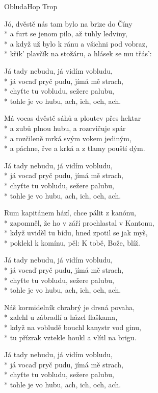 \documentclass[10.5pt]{book}
\begin{document}
\fi
\begin{poem}{Obluda}{Hop Trop}

\settowidth{\versewidth}{křik' plavčík na stožáru, a hlásek se mu třás'}

Jó, dvěstě nás tam bylo na brize do Číny\\*
a furt se jenom pilo, až tuhly ledviny,\\*
a když už bylo k ránu a všichni pod vobraz,\\*
křik' plavčík na stožáru, a hlásek se mu třás':

Já tady nebudu, já vidím vobludu,\\*
já vocaď pryč pudu, jímá mě strach,\\*
chyťte tu vobludu, sežere palubu,\\*
tohle je vo hubu, ach, ich, och, ach.

Má vocas dvěstě sáhů a ploutev přes hektar\\*
a zubů plnou hubu, a rozcvičuje spár\\*
a rozčileně mrká svým vokem jediným,\\*
a páchne, řve a krká a z tlamy pouští dým.

Já tady nebudu, já vidím vobludu,\\*
já vocaď pryč pudu, jímá mě strach,\\*
chyťte tu vobludu, sežere palubu,\\*
tohle je vo hubu, ach, ich, och, ach.

Rum kapitánem hází, chce pálit z kanónu,\\*
zapomněl, že ho v září prochlastal v Kantonu,\\*
když uviděl tu bídu, hned zpotil se jak myš,\\*
poklekl k komínu, pěl: K tobě, Bože, blíž.

Já tady nebudu, já vidím vobludu,\\*
já vocaď pryč pudu, jímá mě strach,\\*
chyťte tu vobludu, sežere palubu,\\*
tohle je vo hubu, ach, ich, och, ach.

Náš kormidelník chrabrý je drsná povaha,\\*
zalehl u zábradlí a házel flaškama,\\*
když na vobludě bouchl kanystr vod ginu,\\*
tu přízrak vztekle houkl a vlítl na brigu.

Já tady nebudu, já vidím vobludu,\\*
já vocaď pryč pudu, jímá mě strach,\\*
chyťte tu vobludu, sežere palubu,\\*
tohle je vo hubu, ach, ich, och, ach.


\end{poem}
\end{document}
